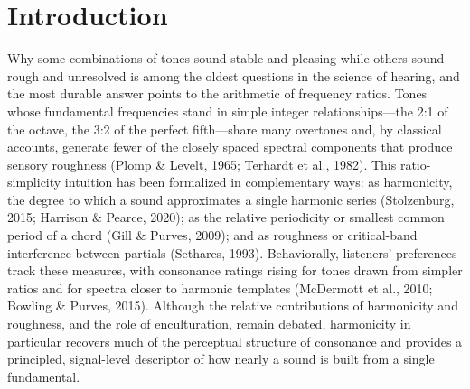 \documentclass[11pt]{article}
\begin{document}
\vspace{10pt}

\section{Introduction}
Why some combinations of tones sound stable and pleasing while others sound rough and unresolved is among the oldest questions in the science of hearing, and the most durable answer points to the arithmetic of frequency ratios. Tones whose fundamental frequencies stand in simple integer relationships---the 2:1 of the octave, the 3:2 of the perfect fifth---share many overtones and, by classical accounts, generate fewer of the closely spaced spectral components that produce sensory roughness (Plomp \& Levelt, 1965; Terhardt et al., 1982). This ratio-simplicity intuition has been formalized in complementary ways: as harmonicity, the degree to which a sound approximates a single harmonic series (Stolzenburg, 2015; Harrison \& Pearce, 2020); as the relative periodicity or smallest common period of a chord (Gill \& Purves, 2009); and as roughness or critical-band interference between partials (Sethares, 1993). Behaviorally, listeners' preferences track these measures, with consonance ratings rising for tones drawn from simpler ratios and for spectra closer to harmonic templates (McDermott et al., 2010; Bowling \& Purves, 2015). Although the relative contributions of harmonicity and roughness, and the role of enculturation, remain debated, harmonicity in particular recovers much of the perceptual structure of consonance and provides a principled, signal-level descriptor of how nearly a sound is built from a single fundamental.
\end{document}
